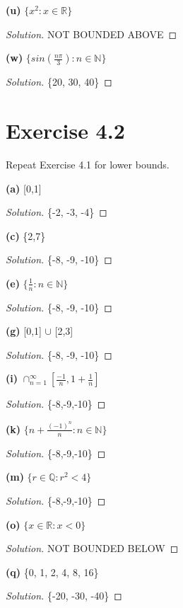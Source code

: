 \documentclass{article}
\begin{document}
\textbf{(u)} $\{x^2:x\in\mathbb{R}\}$
\begin{proof}[Solution]
    NOT BOUNDED ABOVE
\end{proof}

\textbf{(w)} $\{sin\left(\frac{n\pi}{3}\right):n\in\mathbb{N}\}$
\begin{proof}[Solution]
    \{20, 30, 40\}
\end{proof}


\section*{Exercise 4.2}
Repeat Exercise 4.1 for lower bounds.

\textbf{(a)} [0,1]
\begin{proof}[Solution]
    \{-2, -3, -4\}
\end{proof}

\textbf{(c)} \{2,7\}
\begin{proof}[Solution]
    \{-8, -9, -10\}
\end{proof}

\textbf{(e)} $\{\frac{1}{n}:n\in\mathbb{N}\}$
\begin{proof}[Solution]
    \{-8, -9, -10\}
\end{proof}

\textbf{(g)} [0,1] $\cup$ [2,3]
\begin{proof}[Solution]
    \{-8, -9, -10\}
\end{proof}

\textbf{(i)} $\cap^\infty_{n=1}\left[\frac{-1}{n}, 1+\frac{1}{n}\right]$
\begin{proof}[Solution]
    \{-8,-9,-10\}
\end{proof}

\textbf{(k)} $\{n+\frac{(-1)^n}{n}:n\in\mathbb{N}\}$
\begin{proof}[Solution]
    \{-8,-9,-10\}
\end{proof}

\textbf{(m)} $\{r\in\mathbb{Q}:r^2<4\}$
\begin{proof}[Solution]
    \{-8,-9,-10\}
\end{proof}

\textbf{(o)} $\{x\in\mathbb{R}:x<0\}$
\begin{proof}[Solution]
    NOT BOUNDED BELOW
\end{proof}

\textbf{(q)} \{0, 1, 2, 4, 8, 16\}
\begin{proof}[Solution]
    \{-20, -30, -40\}
\end{proof}
\end{document}
